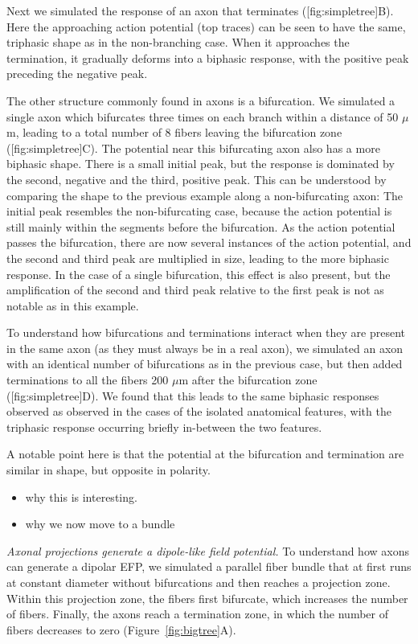 \documentclass[]{article}
\providecommand{\tightlist}{%
  \setlength{\itemsep}{0pt}\setlength{\parskip}{0pt}}
\begin{document}
Next we simulated the response of an axon that terminates
({[}fig:simpletree{]}B). Here the approaching action potential (top
traces) can be seen to have the same, triphasic shape as in the
non-branching case. When it approaches the termination, it gradually
deforms into a biphasic response, with the positive peak preceding the
negative peak.

The other structure commonly found in axons is a bifurcation. We
simulated a single axon which bifurcates three times on each branch
within a distance of 50 \(\mu\)m, leading to a total number of 8 fibers
leaving the bifurcation zone ({[}fig:simpletree{]}C). The potential near
this bifurcating axon also has a more biphasic shape. There is a small
initial peak, but the response is dominated by the second, negative and
the third, positive peak. This can be understood by comparing the shape
to the previous example along a non-bifurcating axon: The initial peak
resembles the non-bifurcating case, because the action potential is
still mainly within the segments before the bifurcation. As the action
potential passes the bifurcation, there are now several instances of the
action potential, and the second and third peak are multiplied in size,
leading to the more biphasic response. In the case of a single
bifurcation, this effect is also present, but the amplification of the
second and third peak relative to the first peak is not as notable as in
this example.

To understand how bifurcations and terminations interact when they are
present in the same axon (as they must always be in a real axon), we
simulated an axon with an identical number of bifurcations as in the
previous case, but then added terminations to all the fibers 200
\(\mu\)m after the bifurcation zone ({[}fig:simpletree{]}D). We found
that this leads to the same biphasic responses observed as observed in
the cases of the isolated anatomical features, with the triphasic
response occurring briefly in-between the two features.

A notable point here is that the potential at the bifurcation and
termination are similar in shape, but opposite in polarity.

\begin{itemize}
\tightlist
\item
  why this is interesting.
\item
  why we now move to a bundle
\end{itemize}

\emph{Axonal projections generate a dipole-like field potential.} To
understand how axons can generate a dipolar EFP, we simulated a parallel
fiber bundle that at first runs at constant diameter without
bifurcations and then reaches a projection zone. Within this projection
zone, the fibers first bifurcate, which increases the number of fibers.
Finally, the axons reach a termination zone, in which the number of
fibers decreases to zero (Figure~\ref{fig:bigtree}A).
\end{document}
